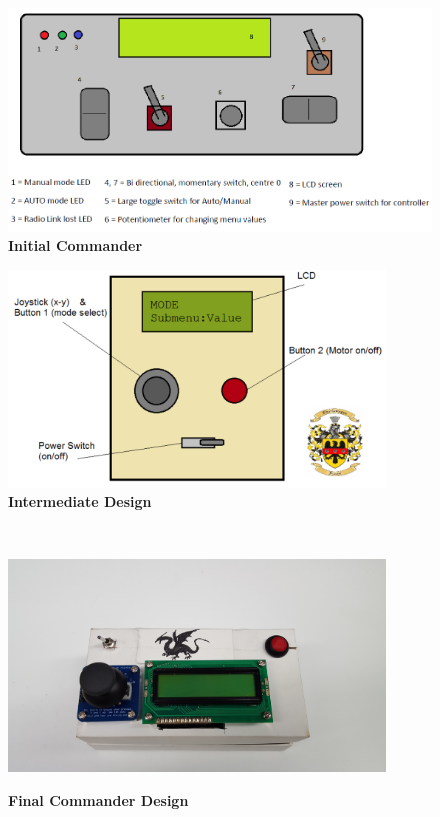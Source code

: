 \documentclass[11pt,a4paper]{article}
\begin{document}
      \begin{figure}
        \caption{\textbf{Initial Commander}}
        \includegraphics[width = 15cm]{initialCommander.png}
      \end{figure}
      \vspace{25pt}
      \begin{figure}
        \caption{\textbf{Intermediate Design}}
        \centering
        \includegraphics[width=10cm]{draftCommander.png}
      \end{figure}
      \vspace{25pt}
      \\
      \begin{figure}
        \centering
        \caption{\textbf{Final Commander Design}}
        \includegraphics[width=10cm]{finalCommander.png}
        \label{fig:commanderDesign}
      \end{figure}
\end{document}
